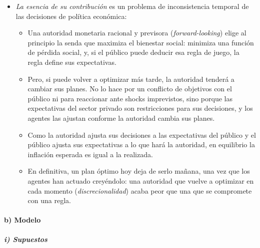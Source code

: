 \documentclass[11pt]{article}
\begin{document}
\begin{itemize}
\begin{itemize}
  \item \emph{Teórica}: justifican una política monetaria reglada con un objetivo de control de la inflación, e introducen el concepto de consistencia dinámica, que después pasó a otros ámbitos, como los impuestos sobre el capital, las patentes o la teoría de la regulación .
  \item \emph{Práctica}: han estimulado la adopción de objetivos de inflación en muchos países.
  \end{itemize}
\item \emph{La esencia de su contribución} es un problema de inconsistencia temporal de las decisiones de política económica:
  \begin{itemize}
  \item Una autoridad monetaria racional y previsora (\emph{forward-looking}) elige al principio la senda que maximiza el bienestar social: minimiza una función de pérdida social, y, si el público puede deducir esa regla de juego, la regla define sus expectativas.
  \item Pero, si puede volver a optimizar más tarde, la autoridad tenderá a cambiar sus planes. No lo hace por un conflicto de objetivos con el público ni para reaccionar ante shocks imprevistos, sino porque las expectativas del sector privado son restricciones para sus decisiones, y los agentes las ajustan conforme la autoridad cambia sus planes.
  \item Como la autoridad ajusta sus decisiones a las expectativas del público y el público ajusta sus expectativas a lo que hará la autoridad, en equilibrio la inflación esperada es igual a la realizada.
  \item En definitiva, un plan óptimo hoy deja de serlo mañana, una vez que los agentes han actuado creyéndolo: una autoridad que vuelve a optimizar en cada momento (\emph{discrecionalidad}) acaba peor que una que se compromete con una regla.
  \end{itemize}
\end{itemize}

\paragraph{b) Modelo}

\subparagraph{i) Supuestos}
\end{document}
